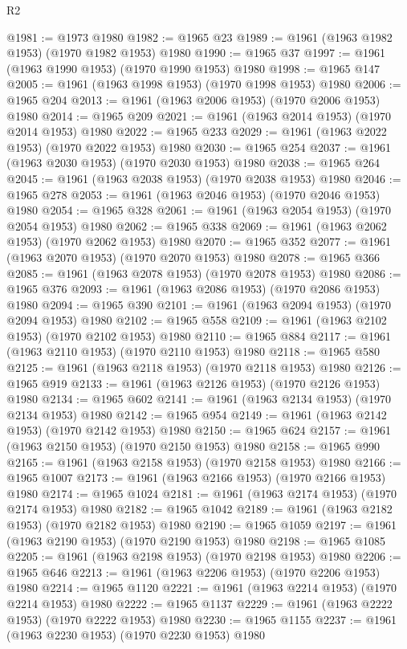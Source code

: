 \begin{lexlean}{R2}
\begin{coremodule}
@1981 := @1973 @1980
@1982 := @1965 @23
@1989 := @1961 (@1963 @1982 @1953) (@1970 @1982 @1953) @1980
@1990 := @1965 @37
@1997 := @1961 (@1963 @1990 @1953) (@1970 @1990 @1953) @1980
@1998 := @1965 @147
@2005 := @1961 (@1963 @1998 @1953) (@1970 @1998 @1953) @1980
@2006 := @1965 @204
@2013 := @1961 (@1963 @2006 @1953) (@1970 @2006 @1953) @1980
@2014 := @1965 @209
@2021 := @1961 (@1963 @2014 @1953) (@1970 @2014 @1953) @1980
@2022 := @1965 @233
@2029 := @1961 (@1963 @2022 @1953) (@1970 @2022 @1953) @1980
@2030 := @1965 @254
@2037 := @1961 (@1963 @2030 @1953) (@1970 @2030 @1953) @1980
@2038 := @1965 @264
@2045 := @1961 (@1963 @2038 @1953) (@1970 @2038 @1953) @1980
@2046 := @1965 @278
@2053 := @1961 (@1963 @2046 @1953) (@1970 @2046 @1953) @1980
@2054 := @1965 @328
@2061 := @1961 (@1963 @2054 @1953) (@1970 @2054 @1953) @1980
@2062 := @1965 @338
@2069 := @1961 (@1963 @2062 @1953) (@1970 @2062 @1953) @1980
@2070 := @1965 @352
@2077 := @1961 (@1963 @2070 @1953) (@1970 @2070 @1953) @1980
@2078 := @1965 @366
@2085 := @1961 (@1963 @2078 @1953) (@1970 @2078 @1953) @1980
@2086 := @1965 @376
@2093 := @1961 (@1963 @2086 @1953) (@1970 @2086 @1953) @1980
@2094 := @1965 @390
@2101 := @1961 (@1963 @2094 @1953) (@1970 @2094 @1953) @1980
@2102 := @1965 @558
@2109 := @1961 (@1963 @2102 @1953) (@1970 @2102 @1953) @1980
@2110 := @1965 @884
@2117 := @1961 (@1963 @2110 @1953) (@1970 @2110 @1953) @1980
@2118 := @1965 @580
@2125 := @1961 (@1963 @2118 @1953) (@1970 @2118 @1953) @1980
@2126 := @1965 @919
@2133 := @1961 (@1963 @2126 @1953) (@1970 @2126 @1953) @1980
@2134 := @1965 @602
@2141 := @1961 (@1963 @2134 @1953) (@1970 @2134 @1953) @1980
@2142 := @1965 @954
@2149 := @1961 (@1963 @2142 @1953) (@1970 @2142 @1953) @1980
@2150 := @1965 @624
@2157 := @1961 (@1963 @2150 @1953) (@1970 @2150 @1953) @1980
@2158 := @1965 @990
@2165 := @1961 (@1963 @2158 @1953) (@1970 @2158 @1953) @1980
@2166 := @1965 @1007
@2173 := @1961 (@1963 @2166 @1953) (@1970 @2166 @1953) @1980
@2174 := @1965 @1024
@2181 := @1961 (@1963 @2174 @1953) (@1970 @2174 @1953) @1980
@2182 := @1965 @1042
@2189 := @1961 (@1963 @2182 @1953) (@1970 @2182 @1953) @1980
@2190 := @1965 @1059
@2197 := @1961 (@1963 @2190 @1953) (@1970 @2190 @1953) @1980
@2198 := @1965 @1085
@2205 := @1961 (@1963 @2198 @1953) (@1970 @2198 @1953) @1980
@2206 := @1965 @646
@2213 := @1961 (@1963 @2206 @1953) (@1970 @2206 @1953) @1980
@2214 := @1965 @1120
@2221 := @1961 (@1963 @2214 @1953) (@1970 @2214 @1953) @1980
@2222 := @1965 @1137
@2229 := @1961 (@1963 @2222 @1953) (@1970 @2222 @1953) @1980
@2230 := @1965 @1155
@2237 := @1961 (@1963 @2230 @1953) (@1970 @2230 @1953) @1980

\end{coremodule}
\end{lexlean}
